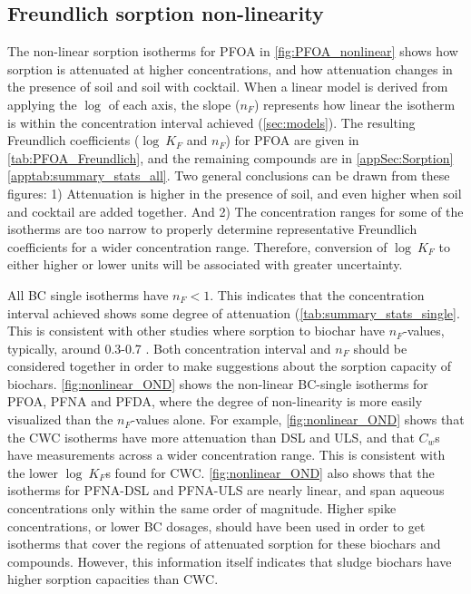 \subsection{Freundlich sorption non-linearity}\label{sec:non-linearity}
The non-linear sorption isotherms for PFOA in \cref{fig:PFOA_nonlinear} shows how sorption is attenuated at higher concentrations, and how attenuation changes in the presence of soil and soil with cocktail. When a linear model is derived from applying the $\log$ of each axis, the slope ($n_F$) represents how linear the isotherm is within the concentration interval achieved (\cref{sec:models}). The resulting Freundlich coefficients ($\log~K_F$ and $n_F$) for PFOA are given in \cref{tab:PFOA_Freundlich}, and the remaining compounds are in \cref{appSec:Sorption}\cref{apptab:summary_stats_all}. Two general conclusions can be drawn from these figures: 1) Attenuation is higher in the presence of soil, and even higher when soil and cocktail are added together. And 2) The concentration ranges for some of the isotherms are too narrow to properly determine representative Freundlich coefficients for a wider concentration range. Therefore, conversion of $\log~K_F$ to either higher or lower units will be associated with greater uncertainty. 

All BC single isotherms have $n_F<1$. This indicates that the concentration interval achieved shows some degree of attenuation (\cref{tab:summary_stats_single}. This is consistent with other studies where sorption to biochar have $n_F$-values, typically, around 0.3-0.7 \citep{Cornelissen2005}. Both concentration interval and $n_F$ should be considered together in order to make suggestions about the sorption capacity of biochars. \cref{fig:nonlinear_OND} shows the non-linear BC-single isotherms for PFOA, PFNA and PFDA, where the degree of non-linearity is more easily visualized than the $n_F$-values alone. For example, \cref{fig:nonlinear_OND} shows that the CWC isotherms have more attenuation than DSL and ULS, and that $C_w$s have measurements across a wider concentration range. This is consistent with the lower $\log~K_F$s found for CWC. \cref{fig:nonlinear_OND} also shows that the isotherms for PFNA-DSL and PFNA-ULS are nearly linear, and span aqueous concentrations only within the same order of magnitude. Higher spike concentrations, or lower BC dosages, should have been used in order to get isotherms that cover the regions of attenuated sorption for these biochars and compounds. However, this information itself indicates that sludge biochars have higher sorption capacities than CWC.  

